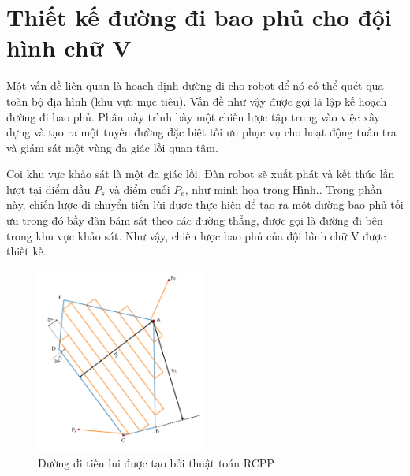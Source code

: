\section{Thiết kế đường đi bao phủ cho đội hình chữ V}
\label{sec:Oppath}
Một vấn đề liên quan là hoạch định đường đi cho robot để nó có thể quét qua toàn bộ địa hình (khu vực mục tiêu). Vấn đề như vậy được gọi là lập kế hoạch đường đi bao phủ. Phần này trình bày một chiến lược tập trung vào việc xây dựng và tạo ra một tuyến đường đặc biệt tối ưu phục vụ cho hoạt động tuần tra và giám sát một vùng đa giác lồi quan tâm.

Coi khu vực khảo sát là một đa giác lồi. Đàn robot sẽ xuất phát và kết thúc lần lượt tại điểm đầu $P_s$ và điểm cuối $P_e$, như minh họa trong Hình.. Trong phần này, chiến lược di chuyển tiến lùi được thực hiện để tạo ra một đường bao phủ tối ưu trong đó bầy đàn bám sát theo các đường thẳng, được gọi là đường đi bên trong khu vực khảo sát. Như vậy, chiến lược bao phủ của đội hình chữ V được thiết kế.

    \begin{figure}[h]
        \centering
        \includegraphics[width=0.5\textwidth]{chapter4/image/sweepline.drawio.pdf}
        \caption{Đường đi tiến lui được tạo bởi thuật toán RCPP}
        \label{fig:SW1}
    \end{figure}
    
